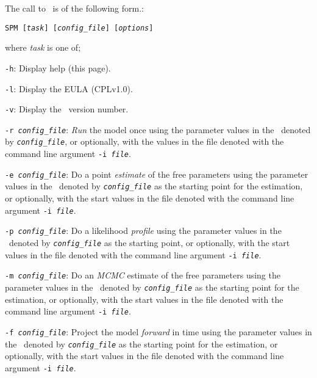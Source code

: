 The call to \SPM\ is of the following form.: 

\texttt{SPM [\emph{task}] [\emph{config\_file}] [\emph{options}]}

where \emph{task} is one of;
\begin{description}
\item \texttt{-h}:{\hspace{0.5cm}  Display help (this page).}

\item \texttt{-l}:{\hspace{0.5cm} Display the EULA (CPLv1.0).}

\item \texttt{-v}:{\hspace{0.5cm} Display the \SPM\ version number.}

\item \texttt{-r \emph{config\_file}}:{\hspace{0.5cm} \emph{Run} the model once using the parameter values in the \config\ denoted by \emph{\texttt{config\_file}}, or optionally, with the values in the file denoted with the command line argument \texttt{-i \emph{file}}.}

\item \texttt{-e \emph{config\_file}}:{\hspace{0.5cm} Do a point \emph{estimate} of the free parameters using the parameter values in the \config\ denoted by \emph{\texttt{config\_file}} as the starting point for the estimation, or optionally, with the start values in the file denoted with the command line argument \texttt{-i \emph{file}}.}

\item \texttt{-p \emph{config\_file}}:{\hspace{0.5cm} Do a likelihood \emph{profile} using the parameter values in the \config\ denoted by \emph{\texttt{config\_file}} as the starting point, or optionally, with the start values in the file denoted with the command line argument \texttt{-i \emph{file}}.}

\item \texttt{-m \emph{config\_file}}:{\hspace{0.5cm} Do an \emph{MCMC} estimate of the free parameters using the parameter values in the \config\ denoted by \emph{\texttt{config\_file}} as the starting point for the estimation, or optionally, with the start values in the file denoted with the command line argument \texttt{-i \emph{file}}.}

\item \texttt{-f \emph{config\_file}}:{\hspace{0.5cm} Project the model \emph{forward} in time using the parameter values in the \config\ denoted by \emph{\texttt{config\_file}} as the starting point for the estimation, or optionally, with the start values in the file denoted with the command line argument \texttt{-i \emph{file}}.}


\end{description}
